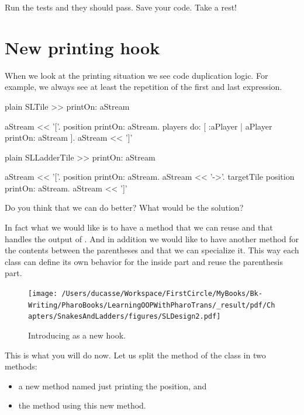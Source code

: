 \documentclass[10pt,twoside,english]{_support/latex/sbabook/sbabook}
\begin{document}
Run the tests and they should pass. Save your code. Take a rest!
\section{New printing hook}
When we look at the printing situation we see code duplication logic.
For example, we always see at least the repetition of the first and last expression.

\begin{displaycode}{plain}
SLTile >> printOn: aStream

	aStream << '['.
	position printOn: aStream.
	players do: [ :aPlayer | aPlayer printOn: aStream ].
	aStream << ']'
\end{displaycode}

\begin{displaycode}{plain}
SLLadderTile >> printOn: aStream

	aStream << '['.
	position printOn: aStream.
	aStream << '->'.
	targetTile position printOn: aStream.
	aStream << ']'
\end{displaycode}

Do you think that we can do better? What would be the solution?

In fact what we would like is to have a method that we can reuse and that 
handles the output of  . And in addition we would like to have another method for the contents between the parentheses and that we can specialize it.  This way each class can define its own behavior for the inside part and reuse the parenthesis part.  


\begin{figure}

\begin{center}
\texttt{[image: /Users/ducasse/Workspace/FirstCircle/MyBooks/Bk-Writing/PharoBooks/LearningOOPWithPharoTrans/\_result/pdf/Chapters/SnakesAndLadders/figures/SLDesign2.pdf]}\caption{Introducing  as a new hook.\label{fig:sldesign2}}\end{center}
\end{figure}


This is what you will do now.
Let us split the  method of the class  in two methods:

\begin{itemize}
\item a new method named  just printing the position, and
\item the  method using this new method. 
\end{itemize}
\end{document}
